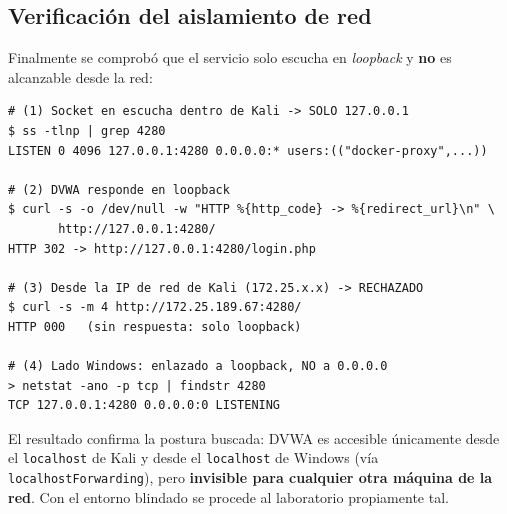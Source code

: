 \documentclass[letter,12pt]{article}
\begin{document}
\subsection*{Verificación del aislamiento de red}
Finalmente se comprobó que el servicio solo escucha en \emph{loopback} y \textbf{no} es alcanzable desde la red:
\begin{verbatim}
# (1) Socket en escucha dentro de Kali -> SOLO 127.0.0.1
$ ss -tlnp | grep 4280
LISTEN 0 4096 127.0.0.1:4280 0.0.0.0:* users:(("docker-proxy",...))

# (2) DVWA responde en loopback
$ curl -s -o /dev/null -w "HTTP %{http_code} -> %{redirect_url}\n" \
       http://127.0.0.1:4280/
HTTP 302 -> http://127.0.0.1:4280/login.php

# (3) Desde la IP de red de Kali (172.25.x.x) -> RECHAZADO
$ curl -s -m 4 http://172.25.189.67:4280/
HTTP 000   (sin respuesta: solo loopback)

# (4) Lado Windows: enlazado a loopback, NO a 0.0.0.0
> netstat -ano -p tcp | findstr 4280
TCP 127.0.0.1:4280 0.0.0.0:0 LISTENING
\end{verbatim}

El resultado confirma la postura buscada: DVWA es accesible únicamente desde el \texttt{localhost} de Kali y desde el \texttt{localhost} de Windows (vía \texttt{localhostForwarding}), pero \textbf{invisible para cualquier otra máquina de la red}. Con el entorno blindado se procede al laboratorio propiamente tal.

\newpage
\end{document}
